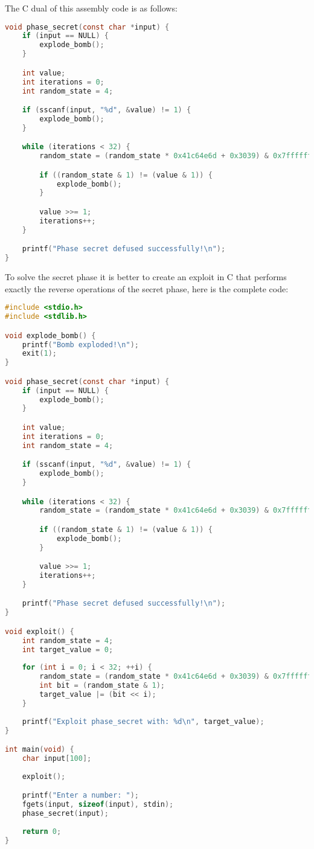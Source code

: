 \documentclass[a4paper,12pt]{report}  %
\begin{document}
The C dual of this assembly code is as follows:
\begin{lstlisting}[language=C,keywords={int, char, if, void, sscanf, explode_bomb, NULL, while, const}]
void phase_secret(const char *input) {
    if (input == NULL) {
        explode_bomb();
    }

    int value;
    int iterations = 0;
    int random_state = 4;

    if (sscanf(input, "%d", &value) != 1) {
        explode_bomb();
    }

    while (iterations < 32) {
        random_state = (random_state * 0x41c64e6d + 0x3039) & 0x7fffffff;

        if ((random_state & 1) != (value & 1)) {
            explode_bomb();
        }

        value >>= 1;
        iterations++;
    }

    printf("Phase secret defused successfully!\n");
}
\end{lstlisting}
To solve the secret phase it is better to create an exploit in C that performs exactly the reverse operations of the secret phase, here is the complete code:
\begin{lstlisting}[language=C,keywords={int, char, if, void, sscanf, const, sizeof, stdin, fgets, printf, exit, NULL}]
#include <stdio.h>
#include <stdlib.h>

void explode_bomb() {
    printf("Bomb exploded!\n");
    exit(1);
}

void phase_secret(const char *input) {
    if (input == NULL) {
        explode_bomb();
    }

    int value;
    int iterations = 0;
    int random_state = 4;

    if (sscanf(input, "%d", &value) != 1) {
        explode_bomb();
    }

    while (iterations < 32) {
        random_state = (random_state * 0x41c64e6d + 0x3039) & 0x7fffffff;

        if ((random_state & 1) != (value & 1)) {
            explode_bomb();
        }

        value >>= 1;
        iterations++;
    }

    printf("Phase secret defused successfully!\n");
}

void exploit() {
    int random_state = 4;
    int target_value = 0;
    
    for (int i = 0; i < 32; ++i) {
        random_state = (random_state * 0x41c64e6d + 0x3039) & 0x7fffffff;
        int bit = (random_state & 1);
        target_value |= (bit << i);
    }
    
    printf("Exploit phase_secret with: %d\n", target_value);
}

int main(void) {
    char input[100];
    
    exploit();

    printf("Enter a number: ");
    fgets(input, sizeof(input), stdin);
    phase_secret(input);
    
    return 0;
}
\end{lstlisting}
\end{document}

